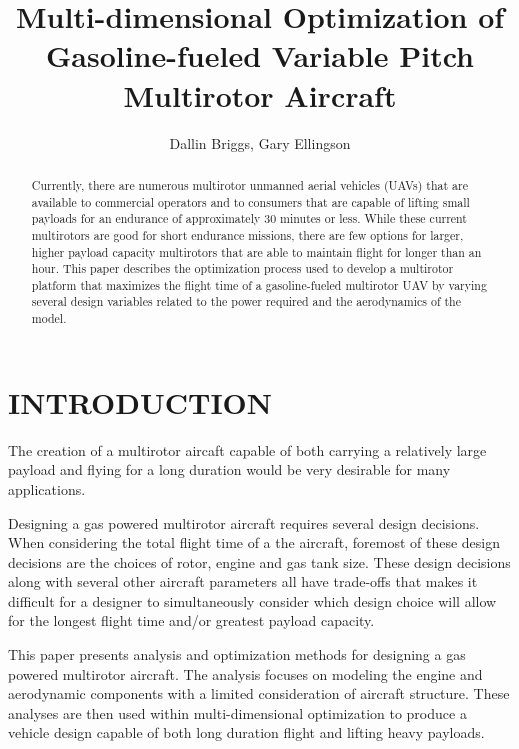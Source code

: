 \documentclass[letterpaper, 10 pt, conference]{ieeeconf}  %
\title{\LARGE \bf
Multi-dimensional Optimization of Gasoline-fueled Variable Pitch Multirotor Aircraft
}
\author{Dallin Briggs, Gary Ellingson%
}
\begin{document}
\maketitle
\thispagestyle{empty}
\pagestyle{empty}


\begin{abstract}

Currently, there are numerous multirotor unmanned aerial vehicles (UAVs) that are available to commercial operators and to consumers that are capable of lifting small payloads for an endurance of approximately 30 minutes or less. While these current multirotors are good for short endurance missions, there are few options for larger, higher payload capacity multirotors that are able to maintain flight for longer than an hour. This paper describes the optimization process used to develop a multirotor platform that maximizes the flight time of a gasoline-fueled multirotor UAV by varying several design variables related to the power required and the aerodynamics of the model.

\end{abstract}


\section{INTRODUCTION}

The creation of a multirotor aircaft capable of both carrying a relatively large payload and flying for a long duration would be very desirable for many applications.

Designing a gas powered multirotor aircraft requires several design decisions. When considering the total flight time of a the aircraft, foremost of these design decisions are the choices of rotor, engine and gas tank size.  These design decisions along with several other aircraft parameters all have trade-offs that makes it difficult for a designer to simultaneously consider which design choice will allow for the longest flight time and/or greatest payload capacity. 

This paper presents analysis and optimization methods for designing a gas powered multirotor aircraft.  The analysis focuses on modeling the engine and aerodynamic components with a limited consideration of aircraft structure.  These analyses are then used within multi-dimensional optimization to produce a vehicle design capable of both long duration flight and lifting heavy payloads. 
\end{document}
